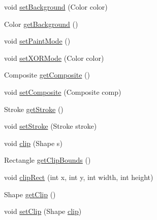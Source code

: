 \begin{DoxyCompactItemize}
\item 
void \mbox{\hyperlink{classorg_1_1jfree_1_1experimental_1_1swt_1_1_s_w_t_graphics2_d_a6b17856429183b2d38d04e182d034198}{set\+Background}} (Color color)
\item 
Color \mbox{\hyperlink{classorg_1_1jfree_1_1experimental_1_1swt_1_1_s_w_t_graphics2_d_aa5d4a6371a629ae1928c6ec62a2fc75c}{get\+Background}} ()
\item 
void \mbox{\hyperlink{classorg_1_1jfree_1_1experimental_1_1swt_1_1_s_w_t_graphics2_d_accc022590c0435ceff25222f21d20e2b}{set\+Paint\+Mode}} ()
\item 
void \mbox{\hyperlink{classorg_1_1jfree_1_1experimental_1_1swt_1_1_s_w_t_graphics2_d_a8e78a2298e013c4b0a0c952ea6bc6385}{set\+X\+O\+R\+Mode}} (Color color)
\item 
Composite \mbox{\hyperlink{classorg_1_1jfree_1_1experimental_1_1swt_1_1_s_w_t_graphics2_d_a79598400c053e1367fd2d4f3af36aca0}{get\+Composite}} ()
\item 
void \mbox{\hyperlink{classorg_1_1jfree_1_1experimental_1_1swt_1_1_s_w_t_graphics2_d_a0be3cf64bf3d73c747d7007d9a895cce}{set\+Composite}} (Composite comp)
\item 
Stroke \mbox{\hyperlink{classorg_1_1jfree_1_1experimental_1_1swt_1_1_s_w_t_graphics2_d_ab44f8c6b4ef40396fa3c34e7be4b2b7a}{get\+Stroke}} ()
\item 
void \mbox{\hyperlink{classorg_1_1jfree_1_1experimental_1_1swt_1_1_s_w_t_graphics2_d_a90d9530e375f481dca4ea8a0b75372ca}{set\+Stroke}} (Stroke stroke)
\item 
void \mbox{\hyperlink{classorg_1_1jfree_1_1experimental_1_1swt_1_1_s_w_t_graphics2_d_a9d77f4cefca4d9a8c5a259ea91fa5de1}{clip}} (Shape s)
\item 
Rectangle \mbox{\hyperlink{classorg_1_1jfree_1_1experimental_1_1swt_1_1_s_w_t_graphics2_d_aff9c51fbbbac9be2ce149452f63a76f4}{get\+Clip\+Bounds}} ()
\item 
void \mbox{\hyperlink{classorg_1_1jfree_1_1experimental_1_1swt_1_1_s_w_t_graphics2_d_ad8f8777992b1ba4754049d53f6d6603e}{clip\+Rect}} (int x, int y, int width, int height)
\item 
Shape \mbox{\hyperlink{classorg_1_1jfree_1_1experimental_1_1swt_1_1_s_w_t_graphics2_d_a25009a0517d9d5ef7918ba7c20f5640d}{get\+Clip}} ()
\item 
void \mbox{\hyperlink{classorg_1_1jfree_1_1experimental_1_1swt_1_1_s_w_t_graphics2_d_aa37b21461f2b51de8e17f5391cfc73e3}{set\+Clip}} (Shape \mbox{\hyperlink{classorg_1_1jfree_1_1experimental_1_1swt_1_1_s_w_t_graphics2_d_a9d77f4cefca4d9a8c5a259ea91fa5de1}{clip}})

\end{DoxyCompactItemize}
